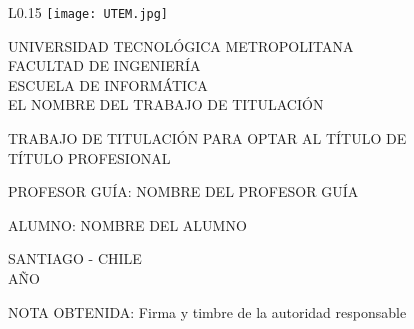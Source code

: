 
\thispagestyle{empty}
\begin{wrapfigure}{L}{0.15\textwidth}
  \centering
  \texttt{[image: UTEM.jpg]}
\end{wrapfigure}

\centering
UNIVERSIDAD TECNOLÓGICA METROPOLITANA\\
FACULTAD DE INGENIERÍA\\
ESCUELA DE INFORMÁTICA\\

\vspace{6cm}
EL NOMBRE DEL TRABAJO DE TITULACIÓN

\vspace{3cm}
TRABAJO DE TITULACIÓN PARA OPTAR AL TÍTULO DE\\
TÍTULO PROFESIONAL

\vspace{3cm}
PROFESOR GUÍA: NOMBRE DEL PROFESOR GUÍA

ALUMNO: NOMBRE DEL ALUMNO

\vfill
SANTIAGO - CHILE\\
AÑO

\newpage
\thispagestyle{empty}

NOTA OBTENIDA:
\vspace{4cm}
\hline
Firma y timbre de la autoridad responsable


\vfill

\justifying

